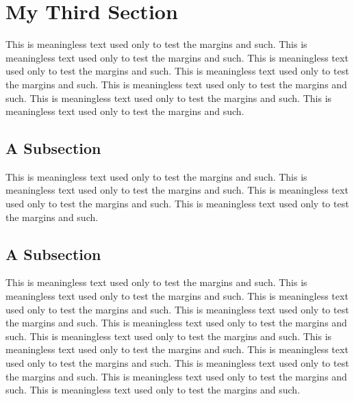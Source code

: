 \section{My Third Section}

This is meaningless text used only to test the margins and such.
This is meaningless text used only to test the margins and such.
This is meaningless text used only to test the margins and such.
This is meaningless text used only to test the margins and such.
This is meaningless text used only to test the margins and such.
This is meaningless text used only to test the margins and such.
This is meaningless text used only to test the margins and such.
\subsection{A Subsection}
This is meaningless text used only to test the margins and such.
This is meaningless text used only to test the margins and such.
This is meaningless text used only to test the margins and such.
This is meaningless text used only to test the margins and such.
\subsection{A Subsection}
This is meaningless text used only to test the margins and such.
This is meaningless text used only to test the margins and such.
This is meaningless text used only to test the margins and such.
This is meaningless text used only to test the margins and such.
This is meaningless text used only to test the margins and such.
This is meaningless text used only to test the margins and such.
This is meaningless text used only to test the margins and such.
This is meaningless text used only to test the margins and such.
This is meaningless text used only to test the margins and such.
This is meaningless text used only to test the margins and such.
This is meaningless text used only to test the margins and such.
